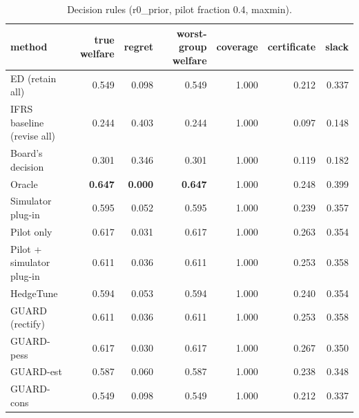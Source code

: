 \begin{table}[t]
\centering
\small
\begin{tabular}{lrrrrrr}
\toprule
method & true welfare & regret & worst-group welfare & coverage & certificate & slack \\
\midrule
ED (retain all) & 0.549 & 0.098 & 0.549 & 1.000 & 0.212 & 0.337 \\
IFRS baseline (revise all) & 0.244 & 0.403 & 0.244 & 1.000 & 0.097 & 0.148 \\
Board's decision & 0.301 & 0.346 & 0.301 & 1.000 & 0.119 & 0.182 \\
Oracle & \textbf{0.647} & \textbf{0.000} & \textbf{0.647} & 1.000 & 0.248 & 0.399 \\
Simulator plug-in & 0.595 & 0.052 & 0.595 & 1.000 & 0.239 & 0.357 \\
Pilot only & 0.617 & 0.031 & 0.617 & 1.000 & 0.263 & 0.354 \\
Pilot + simulator plug-in & 0.611 & 0.036 & 0.611 & 1.000 & 0.253 & 0.358 \\
HedgeTune & 0.594 & 0.053 & 0.594 & 1.000 & 0.240 & 0.354 \\
GUARD (rectify) & 0.611 & 0.036 & 0.611 & 1.000 & 0.253 & 0.358 \\
GUARD-pess & 0.617 & 0.030 & 0.617 & 1.000 & 0.267 & 0.350 \\
GUARD-est & 0.587 & 0.060 & 0.587 & 1.000 & 0.238 & 0.348 \\
GUARD-cons & 0.549 & 0.098 & 0.549 & 1.000 & 0.212 & 0.337 \\
\bottomrule
\end{tabular}
\caption{Decision rules (r0\_prior, pilot fraction 0.4, maxmin).}
\label{tab:methods-maxmin}
\end{table}
